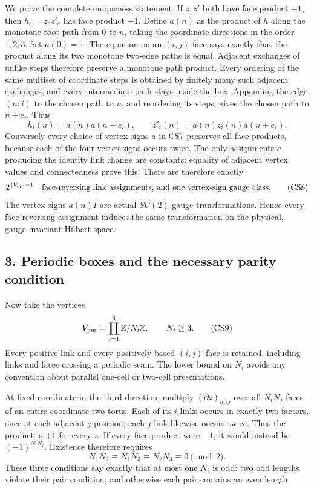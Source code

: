 \documentclass[11pt]{article}
\begin{document}
We prove the complete uniqueness statement. If \(z,z'\) both have face product \(-1\), then \(h_e=z_ez'_e\) has face product \(+1\). Define \(a(n)\) as the product of \(h\) along the monotone root path from \(0\) to \(n\), taking the coordinate directions in the order \(1,2,3\). Set \(a(0)=1\). The equation on an \((i,j)\)-face says exactly that the product along its two monotone two-edge paths is equal. Adjacent exchanges of unlike steps therefore preserve a monotone path product. Every ordering of the same multiset of coordinate steps is obtained by finitely many such adjacent exchanges, and every intermediate path stays inside the box. Appending the edge \((n;i)\) to the chosen path to \(n\), and reordering its steps, gives the chosen path to \(n+e_i\). Thus
\[
 h_i(n)=a(n)a(n+e_i),\qquad
 z'_i(n)=a(n)z_i(n)a(n+e_i).
 \tag{CS7}
\]
Conversely every choice of vertex signs \(a\) in CS7 preserves all face products, because each of the four vertex signs occurs twice. The only assignments \(a\) producing the identity link change are constants: equality of adjacent vertex values and connectedness prove this. There are therefore exactly
\[
 2^{\,|V_{\rm op}|-1}
 \quad\hbox{face-reversing link assignments, and one vertex-sign gauge class.}
 \tag{CS8}
\]
The vertex signs \(a(n)I\) are actual \(SU(2)\) gauge transformations. Hence every face-reversing assignment induces the same transformation on the physical, gauge-invariant Hilbert space.

\subsection*{3. Periodic boxes and the necessary parity condition}

Now take the vertices
\[
 V_{\rm per}=\prod_{i=1}^3\mathbb Z/N_i\mathbb Z,\qquad N_i\ge3.
 \tag{CS9}
\]
Every positive link and every positively based \((i,j)\)-face is retained, including links and faces crossing a periodic seam. The lower bound on \(N_i\) avoids any convention about parallel one-cell or two-cell presentations.

At fixed coordinate in the third direction, multiply \((\partial z)_{n;ij}\) over all \(N_iN_j\) faces of an entire coordinate two-torus. Each of its \(i\)-links occurs in exactly two factors, once at each adjacent \(j\)-position; each \(j\)-link likewise occurs twice. Thus the product is \(+1\) for every \(z\). If every face product were \(-1\), it would instead be \((-1)^{N_iN_j}\). Existence therefore requires
\[
 N_1N_2\equiv N_1N_3\equiv N_2N_3\equiv0\pmod2.
 \tag{CS10}
\]
These three conditions say exactly that at most one \(N_i\) is odd: two odd lengths violate their pair condition, and otherwise each pair contains an even length.
\end{document}
